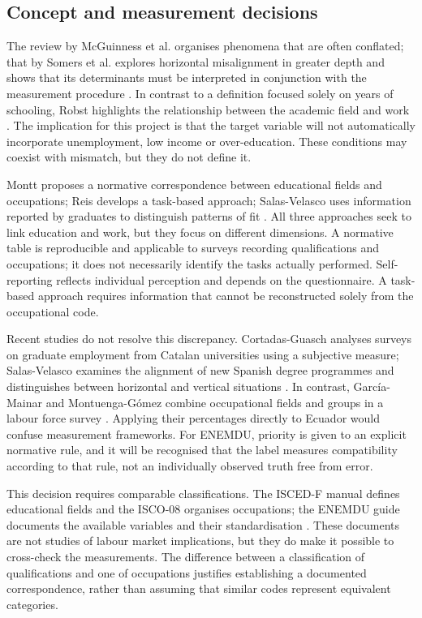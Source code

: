 

\subsection{Concept and measurement decisions}



The review by McGuinness et al. organises phenomena that are often conflated; that by Somers et al. explores horizontal misalignment in greater depth and shows that its determinants must be interpreted in conjunction with the measurement procedure \cite{McGuinness2018,Somers2019}. In contrast to a definition focused solely on years of schooling, Robst highlights the relationship between the academic field and work \cite{Robst2007}. The implication for this project is that the target variable will not automatically incorporate unemployment, low income or over-education. These conditions may coexist with mismatch, but they do not define it.

Montt proposes a normative correspondence between educational fields and occupations; Reis develops a task-based approach; Salas-Velasco uses information reported by graduates to distinguish patterns of fit \cite{Montt2017,Reis2018,Salas-Velasco2021}. All three approaches seek to link education and work, but they focus on different dimensions. A normative table is reproducible and applicable to surveys recording qualifications and occupations; it does not necessarily identify the tasks actually performed. Self-reporting reflects individual perception and depends on the questionnaire. A task-based approach requires information that cannot be reconstructed solely from the occupational code.

Recent studies do not resolve this discrepancy. Cortadas-Guasch analyses surveys on graduate employment from Catalan universities using a subjective measure; Salas-Velasco examines the alignment of new Spanish degree programmes and distinguishes between horizontal and vertical situations \cite{CortadasGuasch2024,SalasVelasco2023}. In contrast, García-Mainar and Montuenga-Gómez combine occupational fields and groups in a labour force survey \cite{GarcaMainar2026}. Applying their percentages directly to Ecuador would confuse measurement frameworks. For ENEMDU, priority is given to an explicit normative rule, and it will be recognised that the label measures compatibility according to that rule, not an individually observed truth free from error.

This decision requires comparable classifications. The ISCED-F manual defines educational fields and the ISCO-08 organises occupations; the ENEMDU guide documents the available variables and their standardisation \cite{Censos2025,Office2012,Statistics2014}. These documents are not studies of labour market implications, but they do make it possible to cross-check the measurements. The difference between a classification of qualifications and one of occupations justifies establishing a documented correspondence, rather than assuming that similar codes represent equivalent categories.

